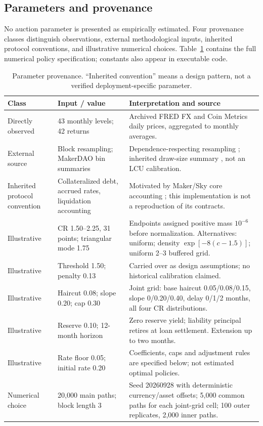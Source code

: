 \documentclass[11pt,a4paper]{article}
\begin{document}
\subsection{Parameters and provenance}
No auction parameter is presented as empirically estimated. Four provenance classes distinguish observations, external methodological inputs, inherited protocol conventions, and illustrative numerical choices. Table~\ref{tab:parameters} contains the full numerical policy specification; constants also appear in executable code.
\begin{table}[H]\centering\small
\caption{Parameter provenance. ``Inherited convention'' means a design pattern, not a verified deployment-specific parameter.}\label{tab:parameters}
\begin{tabularx}{\linewidth}{p{24mm}p{39mm}X}\toprule
Class & Input / value & Interpretation and source\\\midrule
Directly observed & 43 monthly levels; 42 returns & Archived FRED FX and Coin Metrics daily prices, aggregated to monthly averages.\\
External source & Block resampling; MakerDAO bin summaries & Dependence-respecting resampling \cite{Kunsch1989}; inherited draw-size summary \cite{Chaleenutthawut2024,RokniLamouki2026}, not an LCU calibration.\\
Inherited protocol convention & Collateralized debt, accrued rates, liquidation accounting & Motivated by Maker/Sky core accounting \cite{MakerVatDocs}; this implementation is not a reproduction of its contracts.\\
Illustrative & CR 1.50--2.25, 31 points; triangular mode 1.75 & Endpoints assigned positive mass $10^{-6}$ before normalization. Alternatives: uniform; density $\exp[-8(c-1.5)]$; uniform 2--3 buffered grid.\\
Illustrative & Threshold 1.50; penalty 0.13 & Carried over as design assumptions; no historical calibration claimed.\\
Illustrative & Haircut 0.08; slope 0.20; cap 0.30 & Joint grid: base haircut 0.05/0.08/0.15, slope 0/0.20/0.40, delay 0/1/2 months, all four CR distributions.\\
Illustrative & Reserve 0.10; 12-month horizon & Zero reserve yield; liability principal retires at loan settlement. Extension up to two months.\\
Illustrative & Rate floor 0.05; initial rate 0.20 & Coefficients, caps and adjustment rules are specified below; not estimated optimal policies.\\
Numerical choice & 20,000 main paths; block length 3 & Seed 20260928 with deterministic currency/asset offsets; 5,000 common paths for each joint-grid cell; 100 outer replicates, 2,000 inner paths.\\\bottomrule
\end{tabularx}\end{table}
\end{document}

